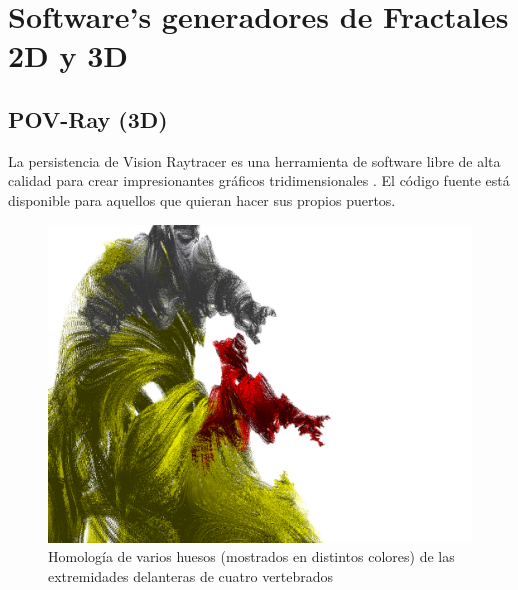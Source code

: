 \documentclass[
  11pt,
]{krantz}
\theoremstyle{definition}
\theoremstyle{definition}
\theoremstyle{definition}
\theoremstyle{definition}
\theoremstyle{remark}
\begin{document}
\hypertarget{softwares-generadores-de-fractales-2d-y-3d}{%
\section{Software's generadores de Fractales 2D y 3D}\label{softwares-generadores-de-fractales-2d-y-3d}}

\hypertarget{pov-ray-3d}{%
\subsection{POV-Ray (3D)}\label{pov-ray-3d}}

La persistencia de Vision Raytracer es una herramienta de software libre de alta calidad para crear impresionantes gráficos tridimensionales . El código fuente está disponible para aquellos que quieran hacer sus propios puertos.

\begin{figure}[!ht]

{\centering \includegraphics[width=1\linewidth]{povray} 

}

\caption{Homología de varios huesos (mostrados en distintos colores) de las extremidades delanteras de cuatro vertebrados}\label{fig:ray}
\end{figure}
\end{document}
